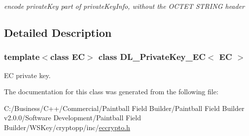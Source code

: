\begin{DoxyCompactItemize}
\begin{DoxyCompactList}\small\item\em encode privateKey part of privateKeyInfo, without the OCTET STRING header \item\end{DoxyCompactList}\end{DoxyCompactItemize}


\subsection{Detailed Description}
\subsubsection*{template$<$class EC$>$ class DL\_\-PrivateKey\_\-EC$<$ EC $>$}

EC private key. 

The documentation for this class was generated from the following file:\begin{DoxyCompactItemize}
\item 
C:/Business/C++/Commercial/Paintball Field Builder/Paintball Field Builder v2.0.0/Software Development/Paintball Field Builder/WSKey/cryptopp/inc/\hyperlink{eccrypto_8h}{eccrypto.h}\end{DoxyCompactItemize}
